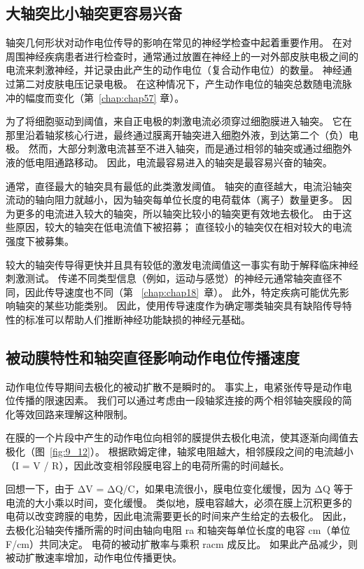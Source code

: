 \subsection{大轴突比小轴突更容易兴奋}

轴突几何形状对动作电位传导的影响在常见的神经学检查中起着重要作用。
在对周围神经疾病患者进行检查时，通常通过放置在神经上的一对外部皮肤电极之间的电流来刺激神经，并记录由此产生的动作电位（复合动作电位）的数量。
神经通过第二对皮肤电压记录电极。
在这种情况下，产生动作电位的轴突总数随电流脉冲的幅度而变化（第~\ref{chap:chap57} 章）。


为了将细胞驱动到阈值，来自正电极的刺激电流必须穿过细胞膜进入轴突。
它在那里沿着轴浆核心行进，最终通过膜离开轴突进入细胞外液，到达第二个（负）电极。
然而，大部分刺激电流甚至不进入轴突，而是通过相邻的轴突或通过细胞外液的低电阻通路移动。
因此，电流最容易进入的轴突是最容易兴奋的轴突。


通常，直径最大的轴突具有最低的此类激发阈值。
轴突的直径越大，电流沿轴突流动的轴向阻力就越小，因为轴突每单位长度的电荷载体（离子）数量更多。
因为更多的电流进入较大的轴突，所以轴突比较小的轴突更有效地去极化。
由于这些原因，较大的轴突在低电流值下被招募；
直径较小的轴突仅在相对较大的电流强度下被募集。


较大的轴突传导得更快并且具有较低的激发电流阈值这一事实有助于解释临床神经刺激测试。
传递不同类型信息（例如，运动与感觉）的神经元通常轴突直径不同，因此传导速度也不同（第 ~\ref{chap:chap18}~章）。 
此外，特定疾病可能优先影响轴突的某些功能类别。
因此，使用传导速度作为确定哪类轴突具有缺陷传导特性的标准可以帮助人们推断神经功能缺损的神经元基础。



\subsection{被动膜特性和轴突直径影响动作电位传播速度}

动作电位传导期间去极化的被动扩散不是瞬时的。
事实上，电紧张传导是动作电位传播的限速因素。
我们可以通过考虑由一段轴浆连接的两个相邻轴突膜段的简化等效回路来理解这种限制。


在膜的一个片段中产生的动作电位向相邻的膜提供去极化电流，使其逐渐向阈值去极化（图~\ref{fig:9_12}）。 
根据欧姆定律，轴浆电阻越大，相邻膜段之间的电流越小（I = V / R），因此改变相邻段膜电容上的电荷所需的时间越长。


回想一下，由于 ΔV = ΔQ/C，如果电流很小，膜电位变化缓慢，因为 ΔQ 等于电流的大小乘以时间，变化缓慢。
类似地，膜电容越大，必须在膜上沉积更多的电荷以改变跨膜的电势，因此电流需要更长的时间来产生给定的去极化。
因此，去极化沿轴突传播所需的时间由轴向电阻 ra 和轴突每单位长度的电容 cm（单位 F/cm）共同决定。 
电荷的被动扩散率与乘积 racm 成反比。
如果此产品减少，则被动扩散速率增加，动作电位传播更快。


